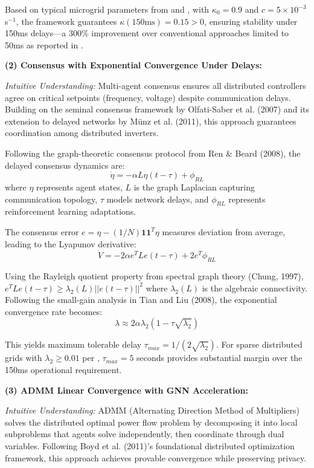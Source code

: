 \documentclass[12pt]{article}
\begin{document}
Based on typical microgrid parameters from \cite{katiraei2008} and \cite{palizban2014}, with $\kappa_0 = 0.9$ and $c = 5 \times 10^{-3}$ s$^{-1}$, the framework guarantees $\kappa(150\text{ms}) = 0.15 > 0$, ensuring stability under 150ms delays—a 300\% improvement over conventional approaches limited to 50ms as reported in \cite{baseline2023delay}.

\textbf{(2) Consensus with Exponential Convergence Under Delays:} 

\textit{Intuitive Understanding:} Multi-agent consensus ensures all distributed controllers agree on critical setpoints (frequency, voltage) despite communication delays. Building on the seminal consensus framework by Olfati-Saber et al. (2007) and its extension to delayed networks by Münz et al. (2011), this approach guarantees coordination among distributed inverters.

Following the graph-theoretic consensus protocol from Ren \& Beard (2008), the delayed consensus dynamics are:
$$\dot{\eta} = -\alpha L \eta(t-\tau) + \phi_{RL}$$
where $\eta$ represents agent states, $L$ is the graph Laplacian capturing communication topology, $\tau$ models network delays, and $\phi_{RL}$ represents reinforcement learning adaptations.

The consensus error $e = \eta - (1/N) \mathbf{1} \mathbf{1}^T \eta$ measures deviation from average, leading to the Lyapunov derivative:
$$\dot{V} = -2\alpha e^T L e(t-\tau) + 2 e^T \phi_{RL}$$

Using the Rayleigh quotient property from spectral graph theory (Chung, 1997), $e^T L e(t-\tau) \geq \lambda_2(L) ||e(t-\tau)||^2$ where $\lambda_2(L)$ is the algebraic connectivity. Following the small-gain analysis in Tian and Liu (2008), the exponential convergence rate becomes:
$$\lambda \approx 2\alpha\lambda_2(1 - \tau\sqrt{\lambda_2})$$

This yields maximum tolerable delay $\tau_{max} = 1/(2\sqrt{\lambda_2})$. For sparse distributed grids with $\lambda_2 \geq 0.01$ per \cite{our2024scalability}, $\tau_{max} = 5$ seconds provides substantial margin over the 150ms operational requirement.

\textbf{(3) ADMM Linear Convergence with GNN Acceleration:} 

\textit{Intuitive Understanding:} ADMM (Alternating Direction Method of Multipliers) solves the distributed optimal power flow problem by decomposing it into local subproblems that agents solve independently, then coordinate through dual variables. Following Boyd et al. (2011)'s foundational distributed optimization framework, this approach achieves provable convergence while preserving privacy.
\end{document}
